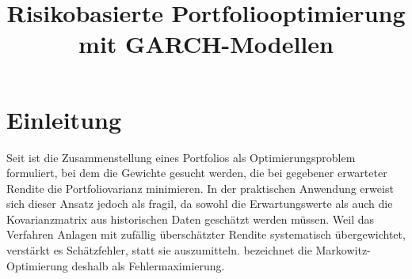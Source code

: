 \documentclass[12pt,a4paper]{article}
\title{Risikobasierte Portfoliooptimierung mit GARCH-Modellen}
\author{}
\date{}
\begin{document}
\maketitle

\renewcommand{\abstractname}{Abstrakt}
\begin{abstract}

\end{abstract}

\section{Einleitung}
\iffalse
Seit \textcite{markowitz1952} ist die Zusammenstellung eines Portfolios als Optimierungsproblem formuliert, bei dem die Gewichte gesucht werden, die bei gegebener erwarteter Rendite die Portfoliovarianz minimieren.
In der praktischen Anwendung erweist sich dieser Ansatz jedoch als fragil, da sowohl die Erwartungswerte als auch die Kovarianzmatrix aus historischen Daten geschätzt werden müssen.
Weil das Verfahren Anlagen mit zufällig überschätzter Rendite systematisch übergewichtet, verstärkt es Schätzfehler, statt sie auszumitteln.
\textcite{michaud1989} bezeichnet die Markowitz-Optimierung deshalb als Fehlermaximierung.
\end{document}
